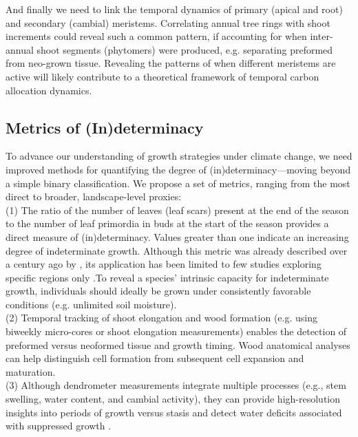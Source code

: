 \documentclass{article}
\begin{document}
And finally we need to link the temporal dynamics of primary (apical and root) and secondary (cambial) meristems. Correlating annual tree rings with shoot increments could reveal such a common pattern, if accounting for when inter-annual shoot segments (phytomers) were produced, e.g. separating preformed from neo-grown tissue. Revealing the patterns of when different meristems are active will likely contribute to a theoretical framework of temporal carbon allocation dynamics.


	
	\subsection*{Metrics of (In)determinacy} %
	To advance our understanding of growth strategies under climate change, we need improved methods for quantifying the degree of (in)determinacy—moving beyond a simple binary classification. We propose a set of metrics, ranging from the most direct to broader, landscape-level proxies: \\
	
	(1) The ratio of the number of leaves (leaf scars) present at the end of the season to the number of leaf primordia in buds at the start of the season provides a direct measure of (in)determinacy. Values greater than one indicate an increasing degree of indeterminate growth. Although this metric was already described over a century ago by \citet{mooreStudyWinterBuds1909}, its application has been limited to few studies exploring specific regions only \citep{damascosBudCompositionBranching2005, kikuzawaLeafSurvivalWoody1983, guedonRelativeExtentsPreformation2006}.To reveal a species' intrinsic capacity for indeterminate growth, individuals should ideally be grown under consistently favorable conditions (e.g. unlimited soil moisture).\\
	
	(2) Temporal tracking of shoot elongation and wood formation (e.g. using biweekly micro-cores or shoot elongation measurements) enables the detection of preformed versus neoformed tissue and growth timing. Wood anatomical analyses can help distinguish cell formation from subsequent cell expansion and maturation.\\
	
	(3) Although dendrometer measurements integrate multiple processes (e.g., stem swelling, water content, and cambial activity), they can provide high-resolution insights into periods of growth versus stasis and detect water deficits associated with suppressed growth \cite{etzoldNumberGrowthDays2021, zweifelWhyTreesGrow2021}. \\
	
\end{document}
